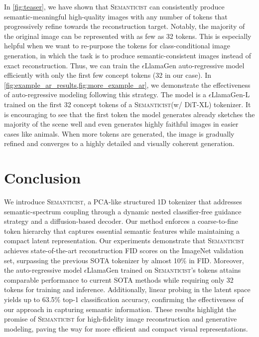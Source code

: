\documentclass[10pt,twocolumn,letterpaper]{article}
\DeclareRobustCommand{\modelname}{\textsc{Semanticist}\xspace}
\DeclareRobustCommand{\armodelname}{$\epsilon$LlamaGen\xspace}
\begin{document}
In \cref{fig:teaser}, we have shown that \modelname can consistently produce semantic-meaningful high-quality images with any number of tokens that progressively refine towards the reconstruction target. 
Notably, the majority of the original image can be represented with as few as 32 tokens. This is especially helpful when we want to re-purpose the tokens for class-conditional image generation, in which the task is to produce semantic-consistent images instead of exact reconstruction. 
Thus, we can train the \armodelname auto-regressive model efficiently with only the first few concept tokens (32 in our case).
In \cref{fig:example_ar_results,fig:more_example_ar}, we demonstrate the effectiveness of auto-regressive modeling following this strategy. 
The model is a \armodelname-L trained on the first 32 concept tokens of a \modelname (w/ DiT-XL) tokenizer.
It is encouraging to see that the first token the model generates already sketches the majority of the scene well and even generates highly faithful images in easier cases like animals. 
When more tokens are generated, the image is gradually refined and converges to a highly detailed and visually coherent generation.











\section{Conclusion}


We introduce \modelname, a PCA-like structured 1D tokenizer that addresses semantic-spectrum coupling through a dynamic nested classifier-free guidance strategy and a diffusion-based decoder. 
Our method enforces a coarse-to-fine token hierarchy that captures essential semantic features while maintaining a compact latent representation.
Our experiments demonstrate that \modelname achieves state-of-the-art reconstruction FID scores on the ImageNet validation set, surpassing the previous SOTA tokenizer by almost 10\% in FID. Moreover, the auto-regressive model \armodelname trained on \modelname's tokens attains comparable performance to current SOTA methods while requiring only 32 tokens for training and inference. Additionally, linear probing in the latent space yields up to 63.5\% top-1 classification accuracy, confirming the effectiveness of our approach in capturing semantic information.
These results highlight the promise of \modelname for high-fidelity image reconstruction and generative modeling, paving the way for more efficient and compact visual representations.
\end{document}
